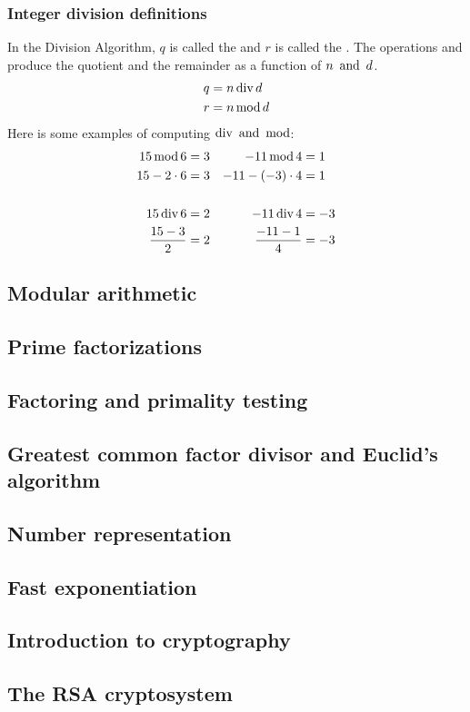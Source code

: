 \subsubsection*{Integer division definitions}
In the Division Algorithm, $q$ is called the  and $r$ is called the . The operations \bld{$\tdiv$} and \bld{$\tmod$} produce the quotient and the remainder as a function of $n \operatorname{~\text{and}~} d$.
\begin{align*}
  q & = n \operatorname{\text{div}} d \\
  r & = n \operatorname{\text{mod}} d
\end{align*}
Here is some examples of computing $\operatorname{\text{div}} \operatorname{~\text{and}~} \operatorname{\text{mod}}$:
\begin{align*}
  15 \operatorname{\text{mod}} 6       & = 3 & -11 \operatorname{\text{mod}} 4        & = 1  \\
  15 - 2 \cdot 6   & = 3 & -11 - (-3) \cdot 4 & = 1  \\ \\
  15 \operatorname{\text{div}} 6       & = 2 & -11 \operatorname{\text{div}} 4        & = -3 \\
  \frac{15 - 3}{2} & = 2 & \frac{-11 - 1}{4}  & = -3
\end{align*}

\subsection{Modular arithmetic}
\subsection{Prime factorizations}
\subsection{Factoring and primality testing}
\subsection{Greatest common factor divisor and Euclid's algorithm}
\subsection{Number representation}
\subsection{Fast exponentiation}
\subsection{Introduction to cryptography}
\subsection{The RSA cryptosystem}